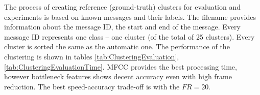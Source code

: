 \documentclass{ExcelAtFIT}
\begin{document}
The process of creating reference (ground-truth) clusters for evaluation and experiments is based on known messages and their labels. The filename provides information about the message ID, the start and end of the message. Every message ID represents one class -- one cluster (of the total of 25 clusters). Every cluster is sorted the same as the automatic one.
The performance of the clustering is shown in tables \ref{tab:ClusteringEvaluation}, \ref{tab:ClusteringEvaluationTime}. MFCC provides the best processing time, however bottleneck features shows decent accuracy even with high frame reduction. The best speed-accuracy trade-off is with the $FR=20$.

\begin{table}[hbt]
\centering
\caption{Clustering performance evaluation by several metrics on different features like MFCC features (M), phoneme posteriors (PP), and bottleneck features (BN) with various settings of frame reduction (FR).}
\label{tab:ClusteringEvaluation}
\end{table}
\end{document}
